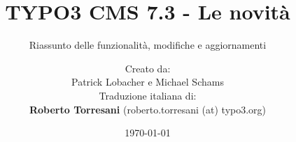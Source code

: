 %
%
%

\documentclass[t]{beamer}

\beamertemplatenavigationsymbolsempty

{
	\usetheme{typo3slides}
}

\title{TYPO3 CMS 7.3 - Le novità}
\subtitle{Riassunto delle funzionalità, modifiche e aggiornamenti}
\author{
	\centerline{Creato da:}
	\centerline{Patrick Lobacher e Michael Schams}
	\vspace{0.4cm}
	\centerline{Traduzione italiana di:}
	\textbf{Roberto Torresani} (roberto.torresani (at) typo3.org)
}

\date{\today}



\sharefont


\begingroup
	[default]
	\begin{frame}
		\titlepage
	\end{frame}
\endgroup


\section*{TYPO3 CMS 7.3 - Le novità}
\begin{frame}[fragile]
	\frametitle{Indice delle sezioni}
	\framesubtitle{Indice delle sezioni}

	\begin{multicols}{2}
		\tableofcontents
	\end{multicols}

\end{frame}

